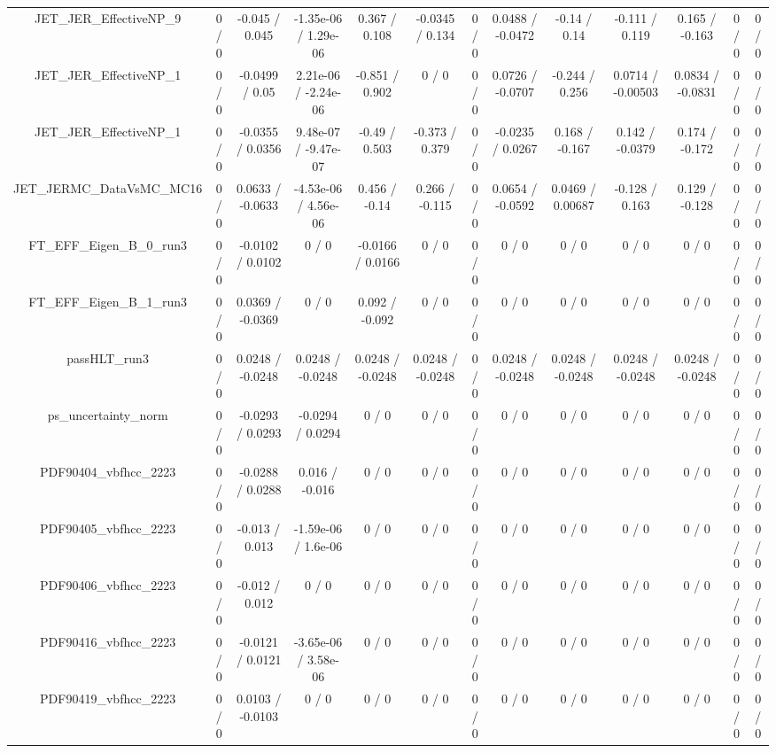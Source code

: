 \documentclass[10pt]{article}
\begin{document}
\begin{table}[htbp]
\begin{center}
\begin{tabular}{|c|c|c|c|c|c|c|c|c|c|c|c|c|}
  JET_JER_EffectiveNP_9 & 0 / 0 & -0.045 / 0.045 & -1.35e-06 / 1.29e-06 & 0.367 / 0.108 & -0.0345 / 0.134 & 0 / 0 & 0.0488 / -0.0472 & -0.14 / 0.14 & -0.111 / 0.119 & 0.165 / -0.163 & 0 / 0 & 0 / 0 \\ 
  JET_JER_EffectiveNP_1 & 0 / 0 & -0.0499 / 0.05 & 2.21e-06 / -2.24e-06 & -0.851 / 0.902 & 0 / 0 & 0 / 0 & 0.0726 / -0.0707 & -0.244 / 0.256 & 0.0714 / -0.00503 & 0.0834 / -0.0831 & 0 / 0 & 0 / 0 \\ 
  JET_JER_EffectiveNP_1 & 0 / 0 & -0.0355 / 0.0356 & 9.48e-07 / -9.47e-07 & -0.49 / 0.503 & -0.373 / 0.379 & 0 / 0 & -0.0235 / 0.0267 & 0.168 / -0.167 & 0.142 / -0.0379 & 0.174 / -0.172 & 0 / 0 & 0 / 0 \\ 
  JET_JERMC_DataVsMC_MC16 & 0 / 0 & 0.0633 / -0.0633 & -4.53e-06 / 4.56e-06 & 0.456 / -0.14 & 0.266 / -0.115 & 0 / 0 & 0.0654 / -0.0592 & 0.0469 / 0.00687 & -0.128 / 0.163 & 0.129 / -0.128 & 0 / 0 & 0 / 0 \\ 
  FT_EFF_Eigen_B_0_run3 & 0 / 0 & -0.0102 / 0.0102 & 0 / 0 & -0.0166 / 0.0166 & 0 / 0 & 0 / 0 & 0 / 0 & 0 / 0 & 0 / 0 & 0 / 0 & 0 / 0 & 0 / 0 \\ 
  FT_EFF_Eigen_B_1_run3 & 0 / 0 & 0.0369 / -0.0369 & 0 / 0 & 0.092 / -0.092 & 0 / 0 & 0 / 0 & 0 / 0 & 0 / 0 & 0 / 0 & 0 / 0 & 0 / 0 & 0 / 0 \\ 
  passHLT_run3 & 0 / 0 & 0.0248 / -0.0248 & 0.0248 / -0.0248 & 0.0248 / -0.0248 & 0.0248 / -0.0248 & 0 / 0 & 0.0248 / -0.0248 & 0.0248 / -0.0248 & 0.0248 / -0.0248 & 0.0248 / -0.0248 & 0 / 0 & 0 / 0 \\ 
  ps_uncertainty_norm & 0 / 0 & -0.0293 / 0.0293 & -0.0294 / 0.0294 & 0 / 0 & 0 / 0 & 0 / 0 & 0 / 0 & 0 / 0 & 0 / 0 & 0 / 0 & 0 / 0 & 0 / 0 \\ 
  PDF90404_vbfhcc_2223 & 0 / 0 & -0.0288 / 0.0288 & 0.016 / -0.016 & 0 / 0 & 0 / 0 & 0 / 0 & 0 / 0 & 0 / 0 & 0 / 0 & 0 / 0 & 0 / 0 & 0 / 0 \\ 
  PDF90405_vbfhcc_2223 & 0 / 0 & -0.013 / 0.013 & -1.59e-06 / 1.6e-06 & 0 / 0 & 0 / 0 & 0 / 0 & 0 / 0 & 0 / 0 & 0 / 0 & 0 / 0 & 0 / 0 & 0 / 0 \\ 
  PDF90406_vbfhcc_2223 & 0 / 0 & -0.012 / 0.012 & 0 / 0 & 0 / 0 & 0 / 0 & 0 / 0 & 0 / 0 & 0 / 0 & 0 / 0 & 0 / 0 & 0 / 0 & 0 / 0 \\ 
  PDF90416_vbfhcc_2223 & 0 / 0 & -0.0121 / 0.0121 & -3.65e-06 / 3.58e-06 & 0 / 0 & 0 / 0 & 0 / 0 & 0 / 0 & 0 / 0 & 0 / 0 & 0 / 0 & 0 / 0 & 0 / 0 \\ 
  PDF90419_vbfhcc_2223 & 0 / 0 & 0.0103 / -0.0103 & 0 / 0 & 0 / 0 & 0 / 0 & 0 / 0 & 0 / 0 & 0 / 0 & 0 / 0 & 0 / 0 & 0 / 0 & 0 / 0 \\ 

\end{tabular}
\end{center}
\end{table}
\end{document}
